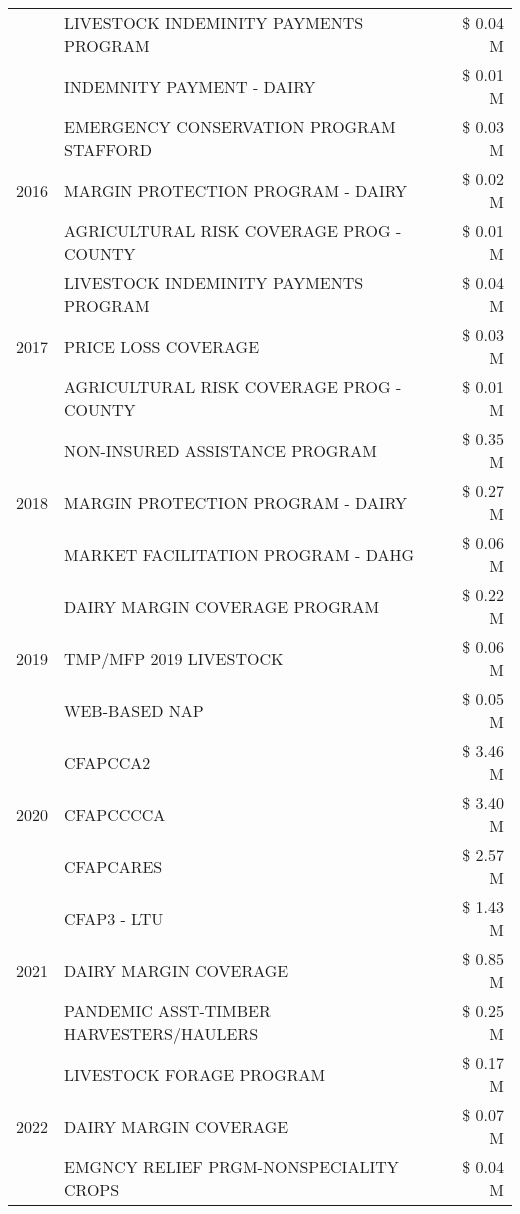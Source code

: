 \begin{tabular}{llr}
 & LIVESTOCK INDEMINITY PAYMENTS PROGRAM & \$ 0.04 M \\
 & INDEMNITY PAYMENT - DAIRY & \$ 0.01 M \\
\cline{1-3}
\multirow[t]{3}{*}{2016} & EMERGENCY CONSERVATION PROGRAM STAFFORD & \$ 0.03 M \\
 & MARGIN PROTECTION PROGRAM - DAIRY & \$ 0.02 M \\
 & AGRICULTURAL RISK COVERAGE PROG - COUNTY & \$ 0.01 M \\
\cline{1-3}
\multirow[t]{3}{*}{2017} & LIVESTOCK INDEMINITY PAYMENTS PROGRAM & \$ 0.04 M \\
 & PRICE LOSS COVERAGE & \$ 0.03 M \\
 & AGRICULTURAL RISK COVERAGE PROG - COUNTY & \$ 0.01 M \\
\cline{1-3}
\multirow[t]{3}{*}{2018} & NON-INSURED ASSISTANCE PROGRAM & \$ 0.35 M \\
 & MARGIN PROTECTION PROGRAM - DAIRY & \$ 0.27 M \\
 & MARKET FACILITATION PROGRAM - DAHG & \$ 0.06 M \\
\cline{1-3}
\multirow[t]{3}{*}{2019} & DAIRY MARGIN COVERAGE PROGRAM & \$ 0.22 M \\
 & TMP/MFP 2019 LIVESTOCK & \$ 0.06 M \\
 & WEB-BASED NAP & \$ 0.05 M \\
\cline{1-3}
\multirow[t]{3}{*}{2020} & CFAPCCA2 & \$ 3.46 M \\
 & CFAPCCCCA & \$ 3.40 M \\
 & CFAPCARES & \$ 2.57 M \\
\cline{1-3}
\multirow[t]{3}{*}{2021} & CFAP3 - LTU & \$ 1.43 M \\
 & DAIRY MARGIN COVERAGE & \$ 0.85 M \\
 & PANDEMIC ASST-TIMBER HARVESTERS/HAULERS & \$ 0.25 M \\
\cline{1-3}
\multirow[t]{3}{*}{2022} & LIVESTOCK FORAGE PROGRAM & \$ 0.17 M \\
 & DAIRY MARGIN COVERAGE & \$ 0.07 M \\
 & EMGNCY RELIEF PRGM-NONSPECIALITY CROPS & \$ 0.04 M \\
\cline{1-3}
\bottomrule
\end{tabular}
